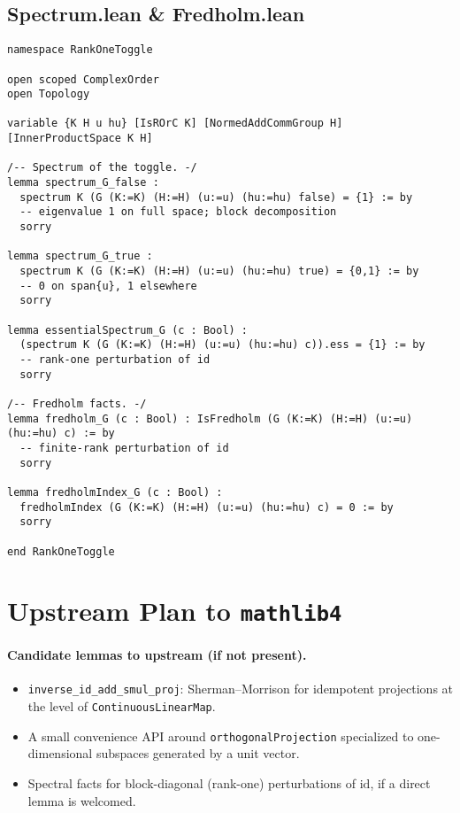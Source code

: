 \documentclass[11pt]{article}
\begin{document}
\subsection*{Spectrum.lean \& Fredholm.lean}
\begin{lstlisting}
namespace RankOneToggle

open scoped ComplexOrder
open Topology

variable {K H u hu} [IsROrC K] [NormedAddCommGroup H] [InnerProductSpace K H]

/-- Spectrum of the toggle. -/
lemma spectrum_G_false :
  spectrum K (G (K:=K) (H:=H) (u:=u) (hu:=hu) false) = {1} := by
  -- eigenvalue 1 on full space; block decomposition
  sorry

lemma spectrum_G_true :
  spectrum K (G (K:=K) (H:=H) (u:=u) (hu:=hu) true) = {0,1} := by
  -- 0 on span{u}, 1 elsewhere
  sorry

lemma essentialSpectrum_G (c : Bool) :
  (spectrum K (G (K:=K) (H:=H) (u:=u) (hu:=hu) c)).ess = {1} := by
  -- rank-one perturbation of id
  sorry

/-- Fredholm facts. -/
lemma fredholm_G (c : Bool) : IsFredholm (G (K:=K) (H:=H) (u:=u) (hu:=hu) c) := by
  -- finite-rank perturbation of id
  sorry

lemma fredholmIndex_G (c : Bool) :
  fredholmIndex (G (K:=K) (H:=H) (u:=u) (hu:=hu) c) = 0 := by
  sorry

end RankOneToggle
\end{lstlisting}

\section{Upstream Plan to \texttt{mathlib4}}\label{sec:upstream}

\paragraph{Candidate lemmas to upstream (if not present).}
\begin{itemize}
  \item \texttt{inverse\_id\_add\_smul\_proj}: Sherman--Morrison for idempotent projections at the level of \texttt{ContinuousLinearMap}.
  \item A small convenience API around \texttt{orthogonalProjection} specialized to one-dimensional subspaces generated by a unit vector.
  \item Spectral facts for block-diagonal (rank-one) perturbations of \(\mathrm{id}\), if a direct lemma is welcomed.
\end{itemize}
\end{document}
